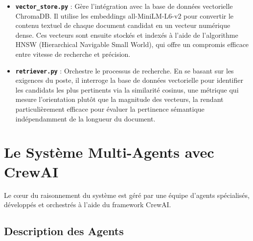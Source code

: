 \documentclass{rapportECL}
\begin{document}
\begin{itemize}[leftmargin=*]
    \item \textbf{\texttt{vector\_store.py}} : Gère l'intégration avec la base de données vectorielle ChromaDB. Il utilise les embeddings all-MiniLM-L6-v2 pour convertir le contenu textuel de chaque document candidat en un vecteur numérique dense. Ces vecteurs sont ensuite stockés et indexés à l'aide de l'algorithme HNSW (Hierarchical Navigable Small World), qui offre un compromis efficace entre vitesse de recherche et précision.
    
    \item \textbf{\texttt{retriever.py}} : Orchestre le processus de recherche. En se basant sur les exigences du poste, il interroge la base de données vectorielle pour identifier les candidats les plus pertinents via la similarité cosinus, une métrique qui mesure l'orientation plutôt que la magnitude des vecteurs, la rendant particulièrement efficace pour évaluer la pertinence sémantique indépendamment de la longueur du document.
\end{itemize}

\section{Le Système Multi-Agents avec CrewAI}

Le cœur du raisonnement du système est géré par une équipe d'agents spécialisés, développés et orchestrés à l'aide du framework CrewAI.

\subsection{Description des Agents}
\end{document}
